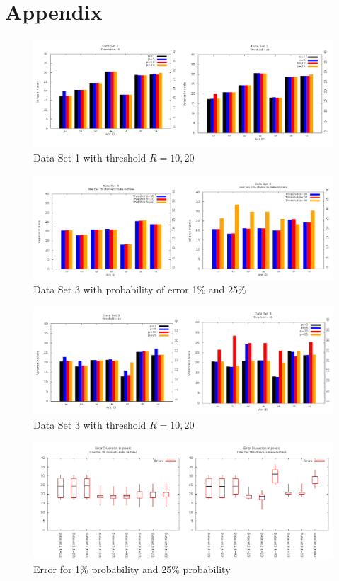 \documentclass[12pt]{article}
\begin{document}
\newpage

\section{Appendix}

\begin{figure}[h!]
\centering
\includegraphics[width=6in]{GDataPlot13.png}
\caption{Data Set 1 with threshold $R=10, 20$}
\label{fig:DS1}
\end{figure}

\begin{figure}[h!]
\centering
\includegraphics[width=6in]{GDataPlot14.png}
\caption{Data Set 3 with probability of error 1\% and 25\%}
\label{fig:DS3P}
\end{figure}

\begin{figure}[h!]
\centering
\includegraphics[width=6in]{GDataPlot15.png}
\caption{Data Set 3 with threshold $R=10,20$}
\label{fig:DS3R}
\end{figure}


\begin{figure}[h!]
\centering
\includegraphics[width=6in]{GDataPlot16.png}
\caption{Error for 1\% probability and 25\% probability}
\label{fig:error1}
\end{figure}
\end{document}
